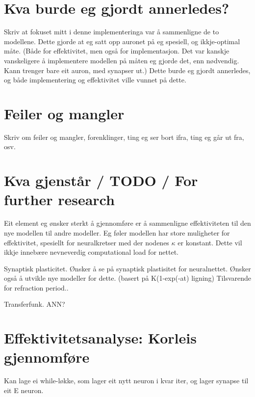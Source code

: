 \section{Kva burde eg gjordt annerledes?}
Skriv at fokuset mitt i denne implementeringa var å sammenligne de to modellene. Dette gjorde at eg satt opp auronet på eg spesiell, og ikkje-optimal måte.
(Både for effektivitet, men også for implementasjon. Det var kanskje vanskeligere å implementere modellen på måten eg gjorde det, enn nødvendig. Kann trenger bare eit auron, med synapser ut.)
Dette burde eg gjordt annerledes, og både implementering og effektivitet ville vunnet på dette.


\section{Feiler og mangler}
Skriv om feiler og mangler, forenklinger, ting eg ser bort ifra, ting eg går ut fra, osv.

%
%

\section{Kva gjenstår / TODO / For further research}
Eit element eg ønsker sterkt å gjennomføre er å sammenligne effektiviteten til den nye modellen til andre modeller. Eg føler modellen har store muligheter for effektivitet, spesiellt for neuralkretser med der nodenes $\kappa$ er konstant.
Dette vil ikkje innebære nevneverdig computational load for nettet.

Synaptisk plasticitet. Ønsker å se på synaptisk plastisitet for neuralnettet.
Ønsker også å utvikle nye modeller for dette. (basert på K(1-exp(-at) ligning)
Tilsvarende for refraction period..

Transferfunk. ANN?

\section{Effektivitetsanalyse: Korleis gjennomføre}
Kan lage ei while-løkke, som lager eit nytt neuron i kvar iter, og lager synapse til eit E neuron.

